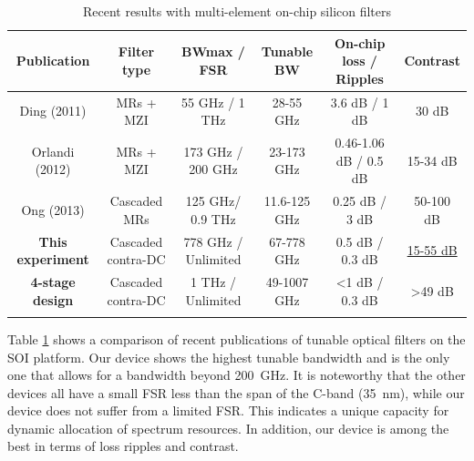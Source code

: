 \documentclass[9pt,twocolumn,twoside]{osajnl}
\begin{document}
	\begin{table}[thb]
		\caption{Recent results with multi-element on-chip silicon filters}
		\begin{tabular}{cccccc}
			\hline
			Publication & Filter type & BWmax / FSR & Tunable BW & On-chip loss / Ripples & Contrast \\
			\hline
			Ding (2011)\cite{ding2011bandwidth} &	MRs + MZI &	55 GHz / 1 THz &	28-55 GHz &	3.6 dB / 1 dB &	30 dB
			\\
			Orlandi (2012)\cite{orlandi2012reconfigurable} &	MRs + MZI &	173 GHz / 200 GHz &	23-173 GHz &	0.46-1.06 dB / 0.5 dB &	15-34 dB
			\\
			Ong (2013)\cite{ong2013ultra} &	Cascaded MRs &	125 GHz/ 0.9 THz &	11.6-125 GHz &	0.25 dB / 3 dB &	50-100 dB
			\\
			\textbf{This experiment }& Cascaded contra-DC &	778 GHz / Unlimited  &	67-778 GHz &	0.5 dB / 0.3 dB &	\underline{15-55 dB }
			\\
			\textbf{4-stage design  }& Cascaded contra-DC &	1 THz / Unlimited  &	49-1007 GHz &	<1 dB / 0.3 dB & >49 dB 
			\\
			
			\hline
			\label{table:comparison}
		\end{tabular}
	\end{table}
	
	Table \ref{table:comparison} shows a comparison of recent publications of tunable optical filters on the SOI platform. 
	Our device shows the highest tunable bandwidth and is the only one that allows for a bandwidth beyond 200~GHz. 
	It is noteworthy that the other devices all have a small FSR less than the span of the C-band (35~nm), while our device does not suffer from a limited FSR.
	This indicates a unique capacity for dynamic allocation of spectrum resources.
	In addition, our device is among the best in terms of loss ripples and contrast.
	
\end{document}
